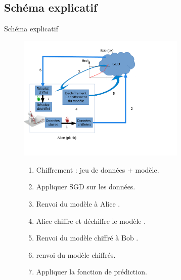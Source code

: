 \documentclass{beamer}
\begin{document}
\subsection{Schéma explicatif}
  \begin{frame}{Schéma explicatif}
  \begin{figure}
   \begin{minipage}[c]{.41\linewidth}
      \includegraphics[width=8cm]{SGD_.pdf}
   \end{minipage} \hfill
   \begin{minipage}[c]{.51\linewidth}
      \begin{enumerate}
    		\item {Chiffrement : jeu de données + modèle.}
  			\item {Appliquer SGD sur les données.}
  			\item {Renvoi du modèle à Alice .}
        \item {Alice chiffre et déchiffre le modèle .}
        \item {Renvoi du modèle chiffré à Bob .}
        \item {renvoi du modèle chiffrés.}
        \item {Appliquer la fonction de prédiction.}
		\end{enumerate}
   \end{minipage}
\end{figure}
\end{frame}
\end{document}
